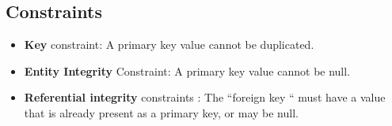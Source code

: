\documentclass{article}
\begin{document}
\subsection{Constraints}
\begin{itemize}
    \item \textbf{Key} constraint: A primary key value cannot be duplicated.
    \item \textbf{Entity Integrity} Constraint: A primary key value cannot be null. 
    \item \textbf{Referential integrity} constraints : The “foreign key “ must have a value that is already present as a primary key, or may be null.
\end{itemize}


\newpage
\end{document}
